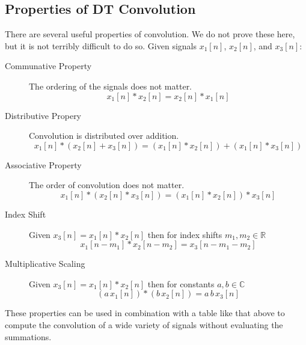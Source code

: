\subsection{Properties of DT Convolution}
There are several useful properties of convolution. We do not prove these here, but it is not terribly difficult to do so. Given signals $x_1[n]$, $x_2[n]$, and $x_3[n]$:

\begin{description}
\item [Communative Property] The ordering of the signals does not matter.
  \[
x_1[n] * x_2[n] = x_2[n] * x_1[n]
  \]
\item [Distributive Propery] Convolution is distributed over addition.
  \[
  x_1[n] * \left(x_2[n] + x_3[n]\right) = \left(x_1[n] * x_2[n] \right) + \left(x_1[n] * x_3[n] \right) 
  \]
\item [Associative Property] The order of convolution does not matter.
    \[
  x_1[n] * \left(x_2[n] * x_3[n]\right) = \left(x_1[n] * x_2[n] \right) * x_3[n] 
  \]
\item [Index Shift] Given $x_3[n] = x_1[n] * x_2[n]$ then for index shifts $m_1, m_2 \in \mathbb{R}$
  \[
  x_1[n-m_1] * x_2[n-m_2] = x_3[n-m_1 - m_2]
  \]
\item [Multiplicative Scaling] Given $x_3[n] = x_1[n] * x_2[n]$ then for constants $a,b \in \mathbb{C}$
  \[
  \left(a\, x_1[n]\right) * \left(b\, x_2[n]\right) = a\, b\, x_3[n]
  \]
\end{description}

These properties can be used in combination with a table like that above to compute the convolution of a wide variety of signals without evaluating the summations.

